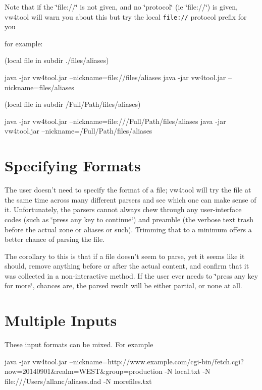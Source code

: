 Note that if the \char`\"{}file\+://\char`\"{} is not given, and no \char`\"{}protocol\char`\"{} (ie \char`\"{}file\+://\char`\"{}) is given, vw4tool will warn you about this but try the local {\tt file\+://} protocol prefix for you

for example\+:

(local file in subdir ./files/aliases) \begin{DoxyVerb}java -jar vw4tool.jar --nickname=file://files/aliases
java -jar vw4tool.jar --nickname=files/aliases
\end{DoxyVerb}


(local file in subdir /\+Full/\+Path/files/aliases) \begin{DoxyVerb}java -jar vw4tool.jar --nickname=file:///Full/Path/files/aliases
java -jar vw4tool.jar --nickname=/Full/Path/files/aliases
\end{DoxyVerb}


\section*{Specifying Formats }

The user doesn't need to specify the format of a file; vw4tool will try the file at the same time across many different parsers and see which one can make sense of it. Unfortunately, the parsers cannot always chew through any user-\/interface codes (such as \char`\"{}press any key to continue\char`\"{}) and preamble (the verbose text trash before the actual zone or aliases or such). Trimming that to a minimum offers a better chance of parsing the file.

The corollary to this is that if a file doesn't seem to parse, yet it seems like it should, remove anything before or after the actual content, and confirm that it was collected in a non-\/interactive method. If the user ever needs to \char`\"{}press any key for more\char`\"{}, chances are, the parsed result will be either partial, or none at all.

\section*{Multiple Inputs }

These input formats can be mixed. For example \begin{DoxyVerb}java -jar vw4tool.jar --nickname=http://www.example.com/cgi-bin/fetch.cgi?now=20140901&realm=WEST&group=production -N local.txt -N file:///Users/allanc/aliases.dad -N morefiles.txt
\end{DoxyVerb}


